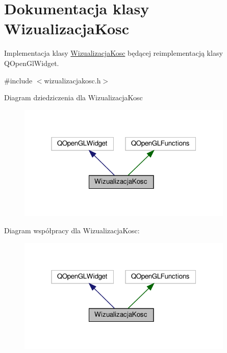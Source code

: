 \hypertarget{class_wizualizacja_kosc}{}\section{Dokumentacja klasy Wizualizacja\+Kosc}
\label{class_wizualizacja_kosc}


Implementacja klasy \hyperlink{class_wizualizacja_kosc}{Wizualizacja\+Kosc} będącej reimplementacją klasy Q\+Open\+Gl\+Widget.  




{\ttfamily \#include $<$wizualizacjakosc.\+h$>$}



Diagram dziedziczenia dla Wizualizacja\+Kosc\nopagebreak
\begin{figure}[H]
\begin{center}
\leavevmode
\includegraphics[width=292pt]{class_wizualizacja_kosc__inherit__graph}
\end{center}
\end{figure}


Diagram współpracy dla Wizualizacja\+Kosc\+:\nopagebreak
\begin{figure}[H]
\begin{center}
\leavevmode
\includegraphics[width=292pt]{class_wizualizacja_kosc__coll__graph}
\end{center}
\end{figure}
